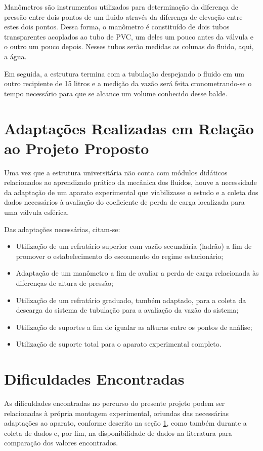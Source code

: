 Manômetros são instrumentos utilizados para determinação da diferença de 
pressão entre dois pontos de um fluido através
da diferença de elevação entre estes dois pontos. Dessa forma, o manômetro 
é constituído de dois tubos transparentes
acoplados ao tubo de PVC, um deles um pouco antes da válvula e o outro um 
pouco depois. Nesses tubos serão medidas as colunas do fluido, aqui, a água.

Em seguida, a estrutura termina com a tubulação despejando o fluido em um 
outro recipiente de 15 litros e a medição da vazão será feita cronometrando-se o
tempo necessário para que se alcance um volume conhecido desse balde.

\section{Adaptações Realizadas em Relação ao Projeto Proposto}%
\label{sec:adaptacoes}

Uma vez que a estrutura universitária não conta com módulos didáticos
relacionados ao aprendizado prático da mecânica dos fluidos, houve a necessidade
da adaptação de um aparato experimental que viabilizasse o estudo e a coleta dos
dados necessários à avaliação do coeficiente de perda de carga localizada para
uma válvula esférica.

Das adaptações necessárias, citam-se:
\begin{itemize}
\item Utilização de um refratário superior com vazão secundária (ladrão) a fim
  de promover o estabelecimento do escoamento do regime estacionário;
\item Adaptação de um manômetro a fim de avaliar a perda de carga relacionada às
  diferenças de altura de pressão;
\item Utilização de um refratário graduado, também adaptado, para a coleta da
  descarga do sistema de tubulação para a avaliação da vazão do sistema;
\item Utilização de suportes a fim de igualar as alturas entre os pontos de
  análise;
\item Utilização de suporte total para o aparato experimental completo.
\end{itemize}

\section{Dificuldades Encontradas}%
\label{sec:dificuldades}

As dificuldades encontradas no percurso do presente projeto podem ser
relacionadas à própria montagem experimental, oriundas das necessárias
adaptações ao aparato, conforme descrito na seção \ref{sec:adaptacoes}, como
também durante a coleta de dados e, por fim, na disponibilidade de dados na
literatura para comparação dos valores encontrados.

